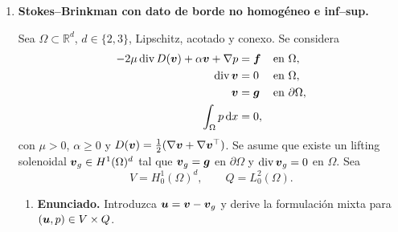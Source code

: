 \documentclass[11pt]{article}
\def\vec   #1{\mbox{\boldmath $#1$}{}}
\def\R{\mathbb R}
\def\dx{\mbox{\(\,\mathrm{d}x\)}}
\DeclareMathOperator{\dive}{div}
\begin{document}
\begin{enumerate}[label=\textbf{\arabic*.}, leftmargin=*]
\item \textbf{Stokes--Brinkman con dato de borde no homogéneo e inf--sup.}

Sea $\Omega\subset\R^d$, $d\in\{2,3\}$, Lipschitz, acotado y conexo. Se considera
\[
\begin{aligned}
    -2\mu\dive D(\vec v)+\alpha\vec v+\nabla p&=\vec f &&\text{en }\Omega,\\
    \dive\vec v&=0 &&\text{en }\Omega,\\
    \vec v&=\vec g &&\text{en }\partial\Omega,\\
    \int_\Omega p\dx&=0,
\end{aligned}
\]
con $\mu>0$, $\alpha\ge0$ y $D(\vec v)=\frac12(\nabla\vec v+\nabla\vec v^\top)$. Se asume que existe un lifting solenoidal $\vec v_g\in H^1(\Omega)^d$ tal que $\vec v_g=\vec g$ en $\partial\Omega$ y $\dive\vec v_g=0$ en $\Omega$. Sea
\[
    V=H^1_0(\Omega)^d,
    \qquad
    Q=L^2_0(\Omega).
\]

\begin{enumerate}[label=(\alph*), leftmargin=*]
    \item \textbf{Enunciado.} Introduzca $\vec u=\vec v-\vec v_g$ y derive la formulación mixta para $(\vec u,p)\in V\times Q$.


\end{enumerate}
\end{enumerate}
\end{document}
